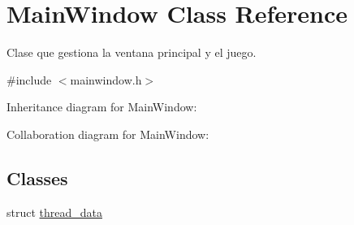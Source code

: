 \hypertarget{classMainWindow}{}\section{Main\+Window Class Reference}
\label{classMainWindow}


Clase que gestiona la ventana principal y el juego.  




{\ttfamily \#include $<$mainwindow.\+h$>$}



Inheritance diagram for Main\+Window\+:


Collaboration diagram for Main\+Window\+:
\subsection*{Classes}
\begin{DoxyCompactItemize}
\item 
struct \hyperlink{structMainWindow_1_1thread__data}{thread\+\_\+data}
\end{DoxyCompactItemize}
